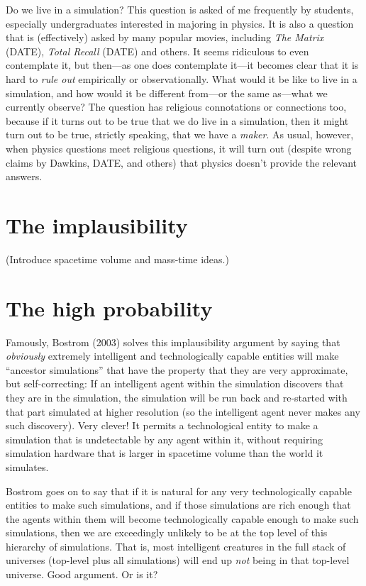 \documentclass[12pt,letterpaper]{article}
\begin{document}
Do we live in a simulation? This question is asked of me frequently by
students, especially undergraduates interested in majoring in physics.
It is also a question that is (effectively) asked by many popular
movies, including \textit{The Matrix} (DATE), \textit{Total Recall}
(DATE) and others.
It seems ridiculous to even contemplate it, but then---as one does
contemplate it---it becomes clear that it is hard to \emph{rule out}
empirically or observationally.
What would it be like to live in a simulation, and how would it be
different from---or the same as---what we currently observe?
The question has religious connotations or connections too, because if
it turns out to be true that we do live in a simulation, then it might
turn out to be true, strictly speaking, that we have a \emph{maker}.
As usual, however, when physics questions meet religious questions, it
will turn out (despite wrong claims by Dawkins, DATE, and others) that
physics doesn't provide the relevant answers.

\section{The implausibility}

(Introduce spacetime volume and mass-time ideas.)

\section{The high probability}

Famously, Bostrom (2003) solves this implausibility argument by saying
that \emph{obviously} extremely intelligent and technologically
capable entities will make ``ancestor simulations'' that have the
property that they are very approximate, but self-correcting: If an
intelligent agent within the simulation discovers that they are in the
simulation, the simulation will be run back and re-started with that
part simulated at higher resolution (so the intelligent agent never
makes any such discovery). Very clever! It permits a technological entity
to make a simulation that is undetectable by any agent within it, without
requiring simulation hardware that is larger in spacetime volume than
the world it simulates.

Bostrom goes on to say that if it is natural for any very
technologically capable entities to make such simulations, and if
those simulations are rich enough that the agents within them will
become technologically capable enough to make such simulations, then
we are exceedingly unlikely to be at the top level of this hierarchy
of simulations. That is, most intelligent creatures in the full stack
of universes (top-level plus all simulations) will end up \emph{not}
being in that top-level universe. Good argument. Or is it?
\end{document}
